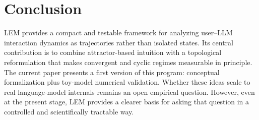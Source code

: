 \documentclass[11pt]{article}
\begin{document}

\section{Conclusion}

LEM provides a compact and testable framework for analyzing user--LLM interaction
dynamics as trajectories rather than isolated states. Its central contribution is to
combine attractor-based intuition with a topological reformulation that makes
convergent and cyclic regimes measurable in principle. The current paper presents a
first version of this program: conceptual formalization plus toy-model numerical
validation. Whether these ideas scale to real language-model internals remains an
open empirical question. However, even at the present stage, LEM provides a clearer
basis for asking that question in a controlled and scientifically tractable way.




\end{document}
